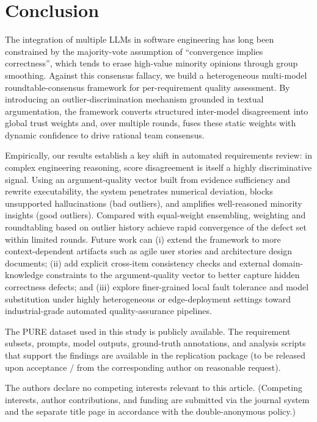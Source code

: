 \documentclass[sn-mathphys-num]{sn-jnl}
\begin{document}
\section{Conclusion}\label{sec:conclusion}
The integration of multiple LLMs in software engineering has long been constrained by the majority-vote assumption of ``convergence implies correctness'', which tends to erase high-value minority opinions through group smoothing. Against this consensus fallacy, we build a heterogeneous multi-model roundtable-consensus framework for per-requirement quality assessment. By introducing an outlier-discrimination mechanism grounded in textual argumentation, the framework converts structured inter-model disagreement into global trust weights and, over multiple rounds, fuses these static weights with dynamic confidence to drive rational team consensus.

Empirically, our results establish a key shift in automated requirements review: in complex engineering reasoning, score disagreement is itself a highly discriminative signal. Using an argument-quality vector built from evidence sufficiency and rewrite executability, the system penetrates numerical deviation, blocks unsupported hallucinations (bad outliers), and amplifies well-reasoned minority insights (good outliers). Compared with equal-weight ensembling, weighting and roundtabling based on outlier history achieve rapid convergence of the defect set within limited rounds. Future work can (i) extend the framework to more context-dependent artifacts such as agile user stories and architecture design documents; (ii) add explicit cross-item consistency checks and external domain-knowledge constraints to the argument-quality vector to better capture hidden correctness defects; and (iii) explore finer-grained local fault tolerance and model substitution under highly heterogeneous or edge-deployment settings toward industrial-grade automated quality-assurance pipelines.

\backmatter

The PURE dataset used in this study is publicly available. The requirement subsets, prompts, model outputs, ground-truth annotations, and analysis scripts that support the findings are available in the replication package (to be released upon acceptance / from the corresponding author on reasonable request).

The authors declare no competing interests relevant to this article. (Competing interests, author contributions, and funding are submitted via the journal system and the separate title page in accordance with the double-anonymous policy.)


\end{document}
